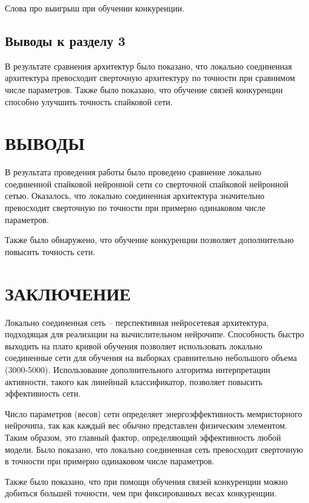 \documentclass[a4paper]{article}
\begin{document}
Слова про выигрыш при обучении конкуренции.

\subsection*{Выводы к разделу 3}
В результате сравнения архитектур было показано, что локально соединенная архитектура превосходит
сверточную архитектуру по точности при сравнимом числе параметров. Также было показано, что обучение связей конкуренции способно улучшить точность спайковой сети.

\clearpage

\section*{ВЫВОДЫ}
В результата проведения работы было проведено сравнение локально соединенной спайковой нейронной сети со сверточной спайковой нейронной сетью. Оказалось, что локально соединенная архитектура значительно превосходит сверточную по точности при примерно одинаковом числе параметров.

Также было обнаружено, что обучение конкуренции позволяет дополнительно повысить точность сети.

\section*{ЗАКЛЮЧЕНИЕ}
Локально соединенная сеть – перспективная нейросетевая архитектура, подходящая для реализации на вычислительном нейрочипе. Способность быстро выходить на плато кривой обучения позволяет использовать локально соединенные сети для обучения на выборках сравнительно небольшого объема (3000-5000). Использование дополнительного алгоритма интерпретации активности, такого как линейный классификатор, позволяет повысить эффективность сети.

Число параметров (весов) сети определяет энергоэффективность мемристорного нейрочипа, так как каждый вес обычно представлен физическим элементом. Таким образом, это главный фактор, определяющий эффективность любой модели. Было показано, что локально соединенная сеть превосходит сверточную в точности при примерно одинаковом числе параметров.

Также было показано, что при помощи обучения связей конкуренции можно добиться большей точности, чем при фиксированных весах конкуренции.
\end{document}
